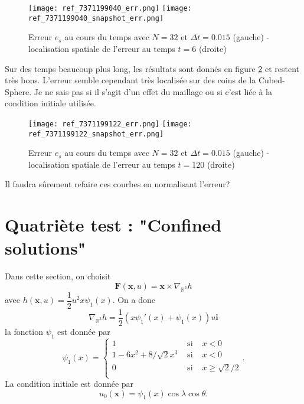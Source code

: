 \documentclass[10pt,a4paper]{article}
\begin{document}
\begin{figure}
\begin{center}
\texttt{[image: ref\_7371199040\_err.png]}
\texttt{[image: ref\_7371199040\_snapshot\_err.png]}
\caption{Erreur $e_s$ au cours du temps avec $N=32$ et $\Delta t =0.015$ (gauche) - localisation spatiale de l'erreur au temps $t=6$ (droite)}
\end{center}
\label{fig:test3a}
\end{figure}

Sur des temps beaucoup plus long, les résultats sont donnés en figure \ref{fig:test3b} et restent très bons. L'erreur semble cependant très localisée sur des coins de la Cubed-Sphere. Je ne sais pas si il s'agit d'un effet du maillage ou si c'est liée à la condition initiale utilisée.

\begin{figure}
\begin{center}
\texttt{[image: ref\_7371199122\_err.png]}
\texttt{[image: ref\_7371199122\_snapshot\_err.png]}
\caption{Erreur $e_s$ au cours du temps avec $N=32$ et $\Delta t =0.015$ (gauche) - localisation spatiale de l'erreur au temps $t=120$ (droite)}
\end{center}
\label{fig:test3b}
\end{figure}

Il faudra sûrement refaire ces courbes en normalisant l'erreur?

\section{Quatriète test : "Confined solutions"}

Dans cette section, on choisit 
\begin{equation}
\mathbf{F}(\mathbf{x},u) = \mathbf{x} \times \nabla_{\mathbb{R}^3} h
\end{equation}
avec $h(\mathbf{x},u) = \dfrac{1}{2} u^2 x \psi_1(x)$. On a donc
\begin{equation}
\nabla_{\mathbb{R}^3} h = \dfrac{1}{2}(x \psi_1'(x) + \psi_1(x)) u  \mathbf{i}
\end{equation}
la fonction $\psi_1$ est donnée par
\begin{equation}
\psi_1(x) = \left\lbrace
\begin{array}{ccl}
1 & \text{ si } & x<0 \\
1 - 6 x^2 + 8/\sqrt{2} x^3 & \text{ si } & x<0 \\
0 & \text{ si } & x \geq \sqrt{2}/2 \\
\end{array}
\right. .
\end{equation}
La condition initiale est donnée par 
\begin{equation}
u_0(\mathbf{x}) = \psi_1(x) \cos \lambda \cos \theta.
\end{equation}
\end{document}
